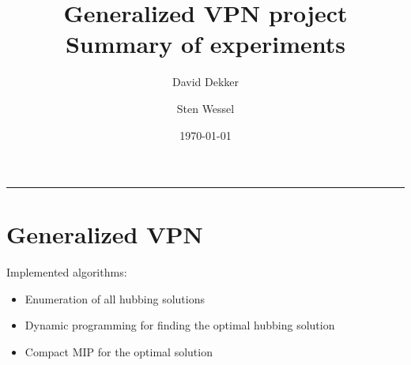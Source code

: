 \documentclass[11pt]{article}
\title{\textbf{Generalized VPN project}\\Summary of experiments}
\author{David Dekker \and Sten Wessel}
\date{\today}
\begin{document}
    \maketitle
    \hrule


    \section{Generalized VPN}
    Implemented algorithms:
    \begin{itemize}
        \item Enumeration of all hubbing solutions
        \item Dynamic programming for finding the optimal hubbing solution
        \item Compact MIP for the optimal solution
    \end{itemize}
\end{document}
